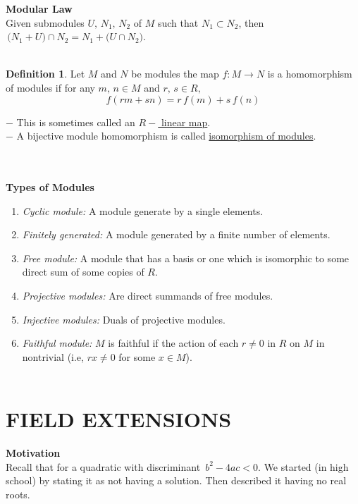 \documentclass[11pt,a4paper]{article}
\theoremstyle{definition}
\newtheorem{defn}[thm]{Definition}
\begin{document}
\textbf{Modular Law}\\
Given submodules $U, \, N_1,\, N_2$ of $M$ such that $N_1\subset N_2$, then $\, \big(N_1 + U\big) \cap N_2 = N_1 + \big(U \cap N_2\big) $.\\\\


\begin{defn}
Let $M$ and $N$ be modules the map $f: M\longrightarrow N$ is a homomorphism of modules if for any $m,\, n \in M$ and $r,\, s\in R,$ $$ f(rm + sn) = r\, f(m) + s\, f(n)$$

$-$ This is sometimes called an \underline{$R-$ linear map}.\\
$-$ A bijective module homomorphism is called \underline{isomorphism of modules}.\\\\\\
\end{defn}





\textbf{Types of Modules}
\begin{enumerate}
\item \textit{Cyclic module:}  A module generate by a single elements.
\item \textit{Finitely generated:}  A module generated by a finite number of elements.
\item \textit{Free module:} A module that has a basis or one which is isomorphic to some direct sum of some copies of $R$.
\item \textit{Projective modules:} Are direct summands of free modules.
\item \textit{Injective modules:} Duals of projective modules.
\item \textit{Faithful module:} $M$ is faithful if the action of each $r\neq 0$ in $R$ on $M$ in nontrivial (i.e, $rx\neq 0$ for some $x\in M$).\\\\
\end{enumerate}






\pagebreak
\section{FIELD EXTENSIONS}

\textbf{Motivation}\\
Recall that for a quadratic with discriminant $\, b^2 - 4ac < 0$. We started (in high school) by stating it as not having a solution. Then described it having no real roots.\\
\end{document}
